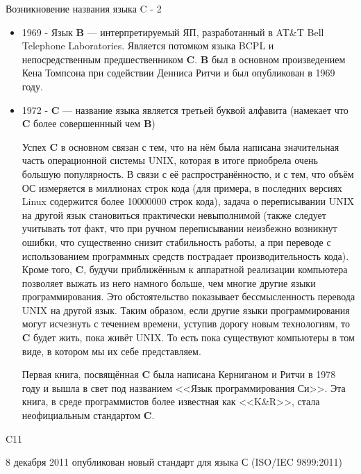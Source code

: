 \begin{frame}[t]{Возникновение названия языка C - 2}
  \begin{itemize}
  
  \item 1969 - Язык \textbf{B} --- интерпретируемый ЯП, разработанный в AT\&T Bell Telephone Laboratories. 
    Является потомком языка BCPL и непосредственным предшественником \textbf{C}. 
    \textbf{B} был в основном произведением Кена Томпсона при содействии Денниса Ритчи и был опубликован в 1969 году.
    
  \item 1972 - \textbf{C} --- название языка является третьей буквой алфавита (намекает что \textbf{C} более совершеннный чем \textbf{B})
  
Успех \textbf{C} в основном связан с тем, что на нём была написана значительная часть операционной системы UNIX, 
которая в итоге приобрела очень большую популярность. 
В связи с её распространённостю, и с тем, что объём ОС измеряется в миллионах строк кода 
(для примера, в последних версиях Linux содержится более 10000000 строк кода), 
задача о переписывании UNIX на другой язык становиться практически невыполнимой 
(также следует учитывать тот факт, что при ручном переписывании неизбежно возникнут ошибки, 
что существенно снизит стабильность работы, а при переводе с использованием программных средств пострадает производительность кода).
Кроме того, \textbf{C}, будучи приближённым к аппаратной реализации компьютера позволяет выжать из него намного больше, 
чем многие другие языки программирования. 
Это обстоятельство показывает бессмысленность перевода UNIX на другой язык. 
Таким образом, если другие языки программирования могут исчезнуть с течением времени, уступив дорогу новым технологиям, 
то \textbf{C} будет жить, пока живёт UNIX. То есть пока существуют компьютеры в том виде, в котором мы их себе представляем.

Первая книга, посвящённая \textbf{C} была написана Керниганом и Ритчи в 1978 году и вышла в свет под названием 
<<Язык программирования Си>>. Эта книга, в среде программистов более известная как <<K\&R>>, стала неофициальным стандартом \textbf{C}.  



  \end{itemize}

\end{frame}


\begin{frame}[t]{C11}

  8 декабря 2011 опубликован новый стандарт для языка С (ISO/IEC 9899:2011)

\end{frame}
